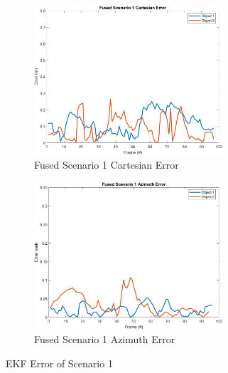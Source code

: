 \begin{figure}[!htb]
    \hspace{0.1\textwidth}
    \begin{subfigure}[b]{0.3\textwidth}%
        \includegraphics[width=7cm]{Figures/matlab/Fused Scenario 1 Cartesian Error.png}
        \caption{Fused Scenario 1 Cartesian Error}
        \label{subfig:err_cart_1}
    \end{subfigure}
    \hspace{0.15\textwidth}
    \begin{subfigure}[b]{0.3\textwidth}%
        \includegraphics[width=7cm]{Figures/matlab/Fused Scenario 1 Azimuth Error.png}
        \caption{Fused Scenario 1 Azimuth Error}
        \label{subfig:err_azi_1}
    \end{subfigure}

    \caption{EKF Error of Scenario 1}
    \label{fig:error_1}
\end{figure}

